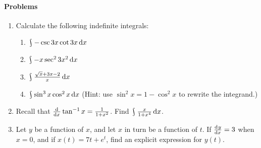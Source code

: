 \paragraph{Problems}
\begin{enumerate}
  \item Calculate the following indefinite integrals:
    \begin{enumerate}
      \item $ \rint -\csc 3x \cot 3x \dif{x} $
      \item $ \rint -x\sec^2 3x^2 \dif{x} $
      \item $ \rint \frac{\sqrt{x} + 3x - 2}{x} \dif{x} $
      \item $ \rint \sin^3 x \cos^2 x \dif{x} $ (Hint: use $ \sin^2 x = 1 - \cos^2 x $ to rewrite the integrand.)
    \end{enumerate}
  \item Recall that $ \od{}{x} \tan^{-1} x = \frac{1}{1 + x^2} $. Find $ \rint \frac{x}{1 + x^4} \dif{x} $.
  \item Let $ y $ be a function of $ x $, and let $ x $ in turn be a function of $ t $. If $ \od{y}{x} = 3 $ when $ x = 0 $,
        and if $ x(t) = 7t + e^t $, find an explicit expression for $ y(t) $.
\end{enumerate}
